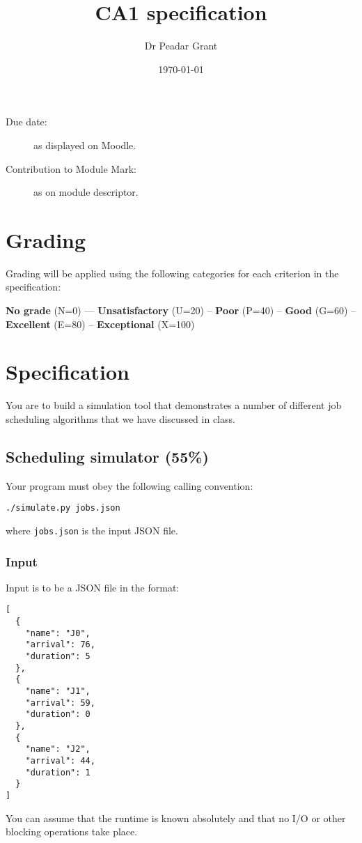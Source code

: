 \documentclass[10pt]{article}
\title{CA1 specification}
\author{Dr Peadar Grant}
\date{\today}
\begin{document}
\maketitle

\begin{description}
\item[Due date:] as displayed on Moodle.
\item[Contribution to Module Mark:] as on module descriptor.
\end{description}

\section{Grading}

Grading will be applied using the following categories for each criterion in the specification:
\begin{center}
  \textbf{No grade} (N=0) --- \textbf{Unsatisfactory} (U=20) -- \textbf{Poor} (P=40) -- \textbf{Good} (G=60) -- \textbf{Excellent} (E=80) -- \textbf{Exceptional} (X=100)
\end{center}

\section{Specification}

You are to build a simulation tool that demonstrates a number of different job scheduling algorithms that we have discussed in class.

\subsection{Scheduling simulator (55\%)}

Your program must obey the following calling convention:
\begin{verbatim}
./simulate.py jobs.json
\end{verbatim}
where \texttt{jobs.json} is the input JSON file.

\subsubsection{Input}

Input is to be a JSON file in the format:
\begin{verbatim}
[
  {
    "name": "J0",
    "arrival": 76,
    "duration": 5
  },
  {
    "name": "J1",
    "arrival": 59,
    "duration": 0
  },
  {
    "name": "J2",
    "arrival": 44,
    "duration": 1
  }
]
\end{verbatim}
You can assume that the runtime is known absolutely and that no I/O or other blocking operations take place.
\end{document}
